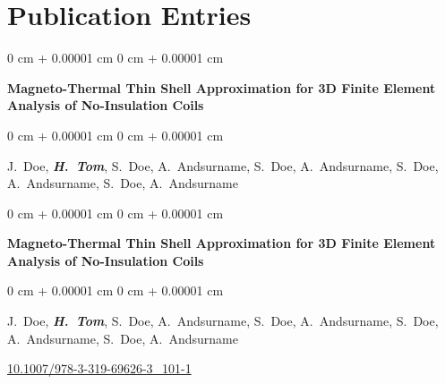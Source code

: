 \documentclass[10pt, letterpaper]{article}
\newenvironment{onecolentry}{
    \begin{adjustwidth}{
        0 cm + 0.00001 cm
    }{
        0 cm + 0.00001 cm
    }
}{
    \end{adjustwidth}
} %
\begin{document}
    \section{Publication Entries}



        
        \begin{samepage}
            \begin{onecolentry}
                \textbf{Magneto-Thermal Thin Shell Approximation for 3D Finite Element Analysis of No-Insulation Coils}
            \end{onecolentry}

            \vspace{0.10 cm}
            
            \begin{onecolentry}
                \mbox{J. Doe}, \mbox{\textbf{\textit{H. Tom}}}, \mbox{S. Doe}, \mbox{A. Andsurname}, \mbox{S. Doe}, \mbox{A. Andsurname}, \mbox{S. Doe}, \mbox{A. Andsurname}, \mbox{S. Doe}, \mbox{A. Andsurname}

                
        \end{onecolentry}
        \end{samepage}

        \vspace{0.2 cm}

        \begin{samepage}
            \begin{onecolentry}
                \textbf{Magneto-Thermal Thin Shell Approximation for 3D Finite Element Analysis of No-Insulation Coils}
            \end{onecolentry}

            \vspace{0.10 cm}
            
            \begin{onecolentry}
                \mbox{J. Doe}, \mbox{\textbf{\textit{H. Tom}}}, \mbox{S. Doe}, \mbox{A. Andsurname}, \mbox{S. Doe}, \mbox{A. Andsurname}, \mbox{S. Doe}, \mbox{A. Andsurname}, \mbox{S. Doe}, \mbox{A. Andsurname}

                \vspace{0.10 cm}
                
        \href{https://doi.org/10.1007/978-3-319-69626-3_101-1}{10.1007/978-3-319-69626-3\_101-1}
        \end{onecolentry}
        \end{samepage}
\end{document}
